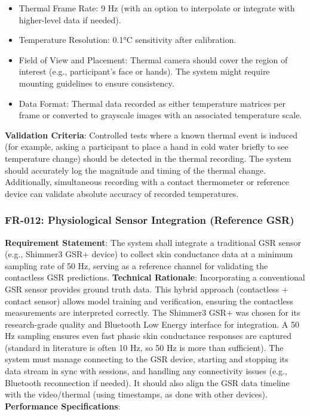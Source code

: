 \documentclass[11pt,a4paper]{report}
\begin{document}
\begin{itemize}
\item Thermal Frame Rate: 9 Hz (with an option to interpolate or integrate with higher-level data if needed).
\item Temperature Resolution: 0.1°C sensitivity after calibration.
\item Field of View and Placement: Thermal camera should cover the region of interest (e.g., participant's face or hands). The system might require mounting guidelines to ensure consistency.
\item Data Format: Thermal data recorded as either temperature matrices per frame or converted to grayscale images with an associated temperature scale.
\end{itemize} \textbf{Validation Criteria}: Controlled tests where a known thermal event is induced (for example, asking a participant to place a hand in cold water briefly to see temperature change) should be detected in the thermal recording. The system should accurately log the magnitude and timing of the thermal change. Additionally, simultaneous recording with a contact thermometer or reference device can validate absolute accuracy of recorded temperatures. \subsubsection*{FR-012: Physiological Sensor Integration (Reference GSR)}
\textbf{Requirement Statement}: The system shall integrate a traditional GSR sensor (e.g., Shimmer3 GSR+ device) to collect skin conductance data at a minimum sampling rate of 50 Hz, serving as a reference channel for validating the contactless GSR predictions. \textbf{Technical Rationale}: Incorporating a conventional GSR sensor provides ground truth data. This hybrid approach (contactless + contact sensor) allows model training and verification, ensuring the contactless measurements are interpreted correctly. The Shimmer3 GSR+ was chosen for its research-grade quality and Bluetooth Low Energy interface for integration. A 50 Hz sampling ensures even fast phasic skin conductance responses are captured (standard in literature is often 10 Hz, so 50 Hz is more than sufficient). The system must manage connecting to the GSR device, starting and stopping its data stream in sync with sessions, and handling any connectivity issues (e.g., Bluetooth reconnection if needed). It should also align the GSR data timeline with the video/thermal (using timestamps, as done with other devices). \textbf{Performance Specifications}:
\end{document}
